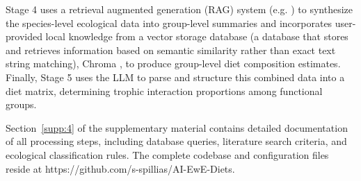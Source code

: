 Stage 4 uses a retrieval augmented generation (RAG) system (e.g. \citep{keck2025extracting}) to synthesize the species-level ecological data into group-level summaries and incorporates user-provided local knowledge from a vector storage database (a database that stores and retrieves information based on semantic similarity rather than exact text string matching), Chroma \citep{Chroma2024}, to produce group-level diet composition estimates. Finally, Stage 5 uses the LLM to parse and structure this combined data into a diet matrix, determining trophic interaction proportions among functional groups.

Section~\ref{supp:4} of the supplementary material contains detailed documentation of all processing steps, including database queries, literature search criteria, and ecological classification rules. The complete codebase and configuration files reside at https://github.com/s-spillias/AI-EwE-Diets.
